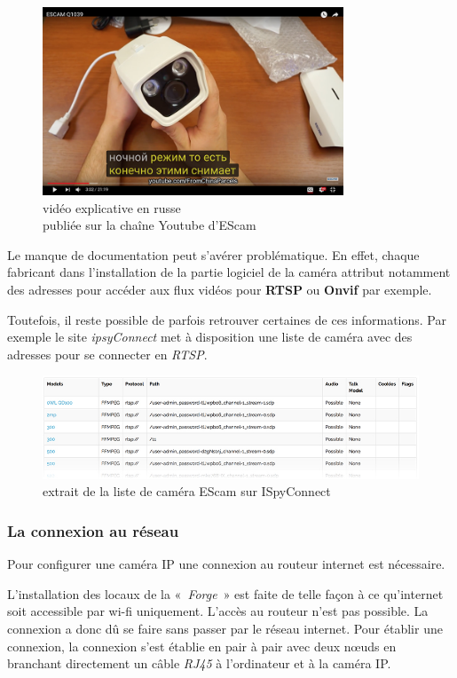 \begin{figure}[H]
	\includegraphics[width=0.8\textwidth]{img/escam_russe.jpg}
    \centering
    \caption{vidéo explicative en russe\\publiée sur la chaîne Youtube d’EScam~\cite{EscamVid}}
    \end{figure}
    Le manque de documentation peut s'avérer problématique. En effet, chaque fabricant dans l'installation de la partie logiciel de la caméra attribut notamment des adresses pour accéder aux flux vidéos pour \textbf{RTSP} ou \textbf{Onvif} par exemple.
    
    Toutefois, il reste possible de parfois retrouver certaines de ces informations. Par exemple le site \textit{ipsyConnect} met à disposition une liste de caméra avec des adresses pour se connecter en \textit{RTSP}.~\cite{ispy}
\begin{figure}[H]
    \includegraphics{img/liste_ispy.jpg}
    \centering
    \caption{extrait de la liste de caméra EScam sur ISpyConnect}
\end{figure}

		\subsubsection{La connexion au réseau}
    Pour configurer une caméra IP une connexion au routeur internet est nécessaire.
        
	L'installation des locaux de la «~\textit{Forge}~» est faite de telle façon à ce qu'internet soit accessible par wi-fi uniquement. L'accès au routeur n'est pas possible. La connexion a donc dû se faire sans passer par le réseau internet. Pour établir une connexion, la connexion s'est établie en pair à pair avec deux nœuds en branchant directement un câble \textit{RJ45} à l'ordinateur et à la caméra IP.
    
